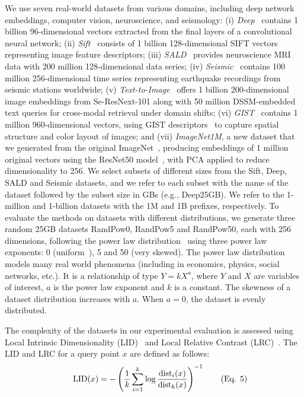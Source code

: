 We use seven real-world datasets from various domains, including deep network embeddings, computer vision, neuroscience, and seismology:  
(i) \emph{Deep}~\cite{url/data/deep1b} contains 1 billion 96-dimensional vectors extracted from the final layers of a convolutional neural network;  
(ii) \emph{Sift}~\cite{conf/icassp/jegou2011,url/data/sift} consists of 1 billion 128-dimensional SIFT vectors representing image feature descriptors;  
(iii) \emph{SALD}~\cite{url/data/eeg} provides neuroscience MRI data with 200 million 128-dimensional data series;  
(iv) \emph{Seismic}~\cite{url/data/seismic} contains 100 million 256-dimensional time series representing earthquake recordings from seismic stations worldwide;  
(v) \emph{Text-to-Image}~\cite{url/data/text2image} offers 1 billion 200-dimensional image embeddings from Se-ResNext-101 along with 50 million DSSM-embedded text queries for cross-modal retrieval under domain shifts;  
(vi) \emph{GIST}~\cite{gist} contains 1 million 960-dimensional vectors, using GIST descriptors~\cite{gistdesc} to capture spatial structure and color layout of images;  and
(vii) \emph{ImageNet1M}, a new dataset that we generated from the original ImageNet~\cite{imagenet}, producing embeddings of 1 million original vectors using the ResNet50 model~\cite{resnet}, with PCA applied to reduce dimensionality to 256. We select subsets of different sizes from the Sift, Deep, SALD and Seismic datasets, and we refer to each subset with the name of the dataset followed by the subset size in GBs (e.g., Deep25GB). 
We refer to the 1-million and 1-billion datasets with the 1M and 1B prefixes, respectively. 
To evaluate the methods on datasets with different distributions, we generate three random 25GB datasets RandPow0, %
RandPow5 and RandPow50, each with 256 dimensions, following the power law distribution~\cite{powerlaw} using three power law exponents: 0 (uniform~\cite{url/power-law}), 5 and 50 (very skewed).
The power law distribution models many real world phenomena (including in economics, physics, %
social networks, etc.). 
It is a relationship of type $Y= kX^a$, where $Y$ and $X$ are variables of interest, $a$ is the power law exponent and $k$ is a constant. 
The skewness of a dataset distribution increases with $a$. 
When $a = 0$, the dataset is evenly distributed.

The complexity of the datasets in our experimental evaluation is assessed using Local Intrinsic Dimensionality (LID)~\cite{lid15,DBLP:journals/is/AumullerC21} and Local Relative Contrast (LRC)~\cite{rc,DBLP:journals/is/AumullerC21}.  
The LID and LRC for a query point \( x \) are  defined as follows: 
\begin{displaymath}
\hspace{1.25cm}
\text{LID}(x) = -\left(\frac{1}{k} \sum_{i=1}^{k} \log \frac{\text{dist}_i(x)}{\text{dist}_{k}(x)}\right)^{-1} \hspace{0.7cm}(\text{Eq. 5}) \tag*{}
\end{displaymath}


